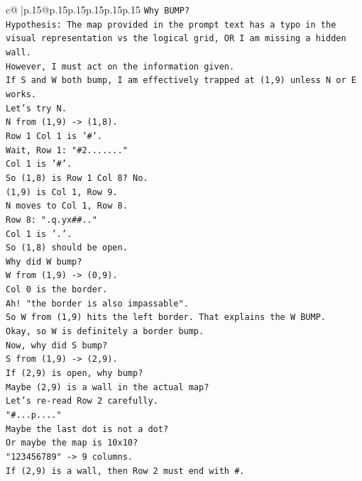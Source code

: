 \documentclass{article}
\begin{document}
{\begin{supertabular}{c@{$\;$}|p{.15\linewidth}@{}p{.15\linewidth}p{.15\linewidth}p{.15\linewidth}p{.15\linewidth}p{.15\linewidth}}
{{{\texttt{Why BUMP?} \\
\texttt{Hypothesis: The map provided in the prompt text has a typo in the visual representation vs the logical grid, OR I am missing a hidden wall.} \\
\texttt{However, I must act on the information given.} \\
\texttt{If S and W both bump, I am effectively trapped at (1,9) unless N or E works.} \\
\texttt{Let's try N.} \\
\texttt{N from (1,9) {-}> (1,8).} \\
\texttt{Row 1 Col 1 is '\#'.} \\
\texttt{Wait, Row 1: "\#2......."} \\
\texttt{Col 1 is '\#'.} \\
\texttt{So (1,8) is Row 1 Col 8? No.} \\
\texttt{(1,9) is Col 1, Row 9.} \\
\texttt{N moves to Col 1, Row 8.} \\
\texttt{Row 8: ".q.yx\#\#.."} \\
\texttt{Col 1 is '.'.} \\
\texttt{So (1,8) should be open.} \\
\texttt{Why did W bump?} \\
\texttt{W from (1,9) {-}> (0,9).} \\
\texttt{Col 0 is the border.} \\
\texttt{Ah! "the border is also impassable".} \\
\texttt{So W from (1,9) hits the left border. That explains the W BUMP.} \\
\texttt{Okay, so W is definitely a border bump.} \\
\texttt{Now, why did S bump?} \\
\texttt{S from (1,9) {-}> (2,9).} \\
\texttt{If (2,9) is open, why bump?} \\
\texttt{Maybe (2,9) is a wall in the actual map?} \\
\texttt{Let's re{-}read Row 2 carefully.} \\
\texttt{"\#...p...."} \\
\texttt{Maybe the last dot is not a dot?} \\
\texttt{Or maybe the map is 10x10?} \\
\texttt{"123456789" {-}> 9 columns.} \\
\texttt{If (2,9) is a wall, then Row 2 must end with \#.} \\
}}}
\end{supertabular}}
\end{document}
